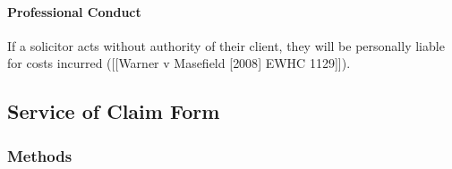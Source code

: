 \documentclass[
]{article}
\begin{document}
\hypertarget{professional-conduct}{%
\paragraph{Professional Conduct}\label{professional-conduct}}

If a solicitor acts without authority of their client, they will be
personally liable for costs incurred ({[}{[}Warner v Masefield
{[}2008{]} EWHC 1129{]}{]}).

\hypertarget{service-of-claim-form}{%
\subsection{Service of Claim Form}\label{service-of-claim-form}}

\hypertarget{methods}{%
\subsubsection{Methods}\label{methods}}
\end{document}
